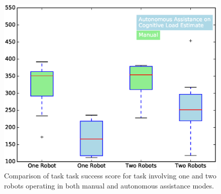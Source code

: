 \documentclass{sig-alternate}
\begin{document}
\begin{figure}
\centering
\includegraphics[width=.5\textwidth]{BoxWiskerTimesCompMaualVsAuto2.eps}
\caption{Comparison of task task success score for task involving one
  and two robots operating in both manual and autonomous assistance
  modes.}
\label{fig:BoxWiskersTimeComp}
\end{figure}

\end{document}
